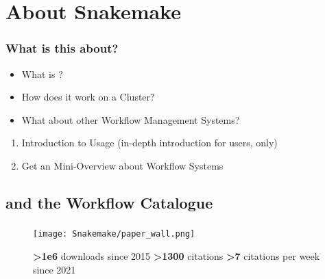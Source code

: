 \section{About Snakemake}
{   
}

\begin{frame}
	\frametitle{What is this about?}
	\begin{question}[Questions]
		\begin{itemize}
			\item What is \Snakemake?
			\item How does it work on a Cluster?
			\item What about other Workflow Management Systems?
		\end{itemize}
	\end{question}
	\begin{docs}[Objectives]
		\begin{enumerate}
			\item Introduction to \Snakemake Usage (in-depth introduction for users, only)
			\item Get an Mini-Overview about Workflow Systems
		\end{enumerate}
	\end{docs}
\end{frame}

\subsection{\Snakemake and the Workflow Catalogue}

\begin{frame}
	\frametitle{\Snakemake}
	\begin{figure}
		\centering
		\caption*{\textbf{>1e6} downloads since 2015\newline
			\textbf{>1300} citations\newline
			\textbf{>7} citations per week since 2021}
		\texttt{[image: Snakemake/paper\_wall.png]}
	\end{figure}
\end{frame}

